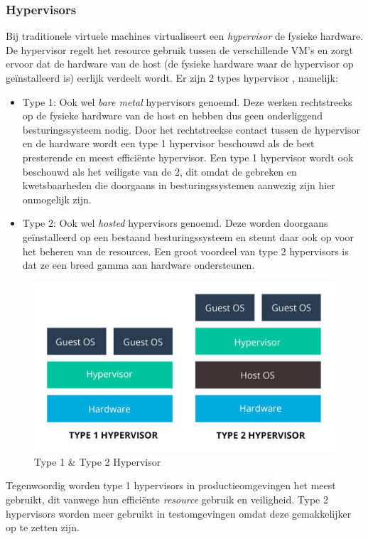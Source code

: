 \subsubsection{Hypervisors}
Bij traditionele virtuele machines virtualiseert een \textit{hypervisor} de fysieke hardware. De hypervisor regelt het resource gebruik tussen de verschillende VM's en zorgt ervoor dat de hardware van de host (de fysieke hardware waar de hypervisor op geïnstalleerd is) eerlijk verdeelt wordt. Er zijn 2 types hypervisor \autocite{VMWare2021}, namelijk:
\begin{itemize}
    \item Type 1: Ook wel \textit{bare metal} hypervisors genoemd. Deze werken rechtstreeks op de fysieke hardware van de host en hebben dus geen onderliggend besturingssysteem nodig. Door het rechtstreekse contact tussen de hypervisor en de hardware wordt een type 1 hypervisor beschouwd als de best presterende en meest efficiënte hypervisor. Een type 1 hypervisor wordt ook beschouwd als het veiligste van de 2, dit omdat de gebreken en kwetsbaarheden die doorgaans in besturingssystemen aanwezig zijn hier onmogelijk zijn.
    \item Type 2: Ook wel \textit{hosted} hypervisors genoemd. Deze worden doorgaans geïnstalleerd op een bestaand besturingssysteem en steunt daar ook op voor het beheren van de resources. Een groot voordeel van type 2 hypervisors is dat ze een breed gamma aan hardware ondersteunen.
\end{itemize}
\begin{figure}[ht]
    \centering
    \includegraphics[width=\linewidth]{img/Hypervisor.png}
    \caption{Type 1 \& Type 2 Hypervisor \autocite{VMWare2021}}
    \label{fig:hypers}
\end{figure}

Tegenwoordig worden type 1 hypervisors in productieomgevingen het meest gebruikt, dit vanwege hun efficiënte \textit{resource} gebruik en veiligheid. Type 2 hypervisors worden meer gebruikt in testomgevingen omdat deze gemakkelijker op te zetten zijn.

